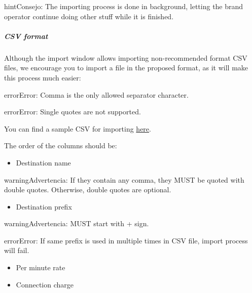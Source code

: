 \documentclass[letterpaper,10pt,spanish]{sphinxmanual}
\begin{document}
\begin{notice}{hint}{Consejo:}
The importing process is done in background, letting the brand operator
continue doing other stuff while it is finished.
\end{notice}


\subparagraph{CSV format}
\label{administration_portal/brand/billing/destination_rates:csv-format}
Although the import window allows importing non-recommended format CSV files,
we encourage you to import a file in the proposed format, as it will make
this process much easier:

\begin{notice}{error}{Error:}
Comma is the only allowed separator character.
\end{notice}

\begin{notice}{error}{Error:}
Single quotes are not supported.
\end{notice}

You can find a sample CSV for importing \href{https://raw.githubusercontent.com/irontec/ivozprovider/artemis/web/admin/samples/pricesSample.csv}{here}.

The order of the columns should be:
\begin{itemize}
\item {} 
Destination name

\end{itemize}

\begin{notice}{warning}{Advertencia:}
If they contain any comma, they MUST be quoted with double quotes. Otherwise, double quotes are optional.
\end{notice}
\begin{itemize}
\item {} 
Destination prefix

\end{itemize}

\begin{notice}{warning}{Advertencia:}
MUST start with + sign.
\end{notice}

\begin{notice}{error}{Error:}
If same prefix is used in multiple times in CSV file, import process will fail.
\end{notice}
\begin{itemize}
\item {} 
Per minute rate

\item {} 
Connection charge

\end{itemize}
\end{document}
